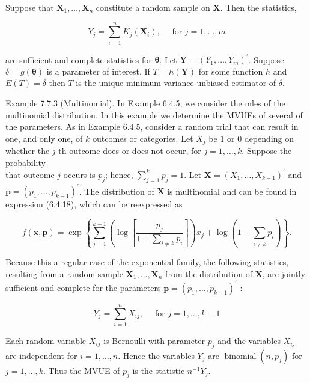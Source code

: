 Suppose that $\mathbf{X}_{1}, \ldots, \mathbf{X}_{n}$ constitute a random sample on $\mathbf{X}$. Then the statistics,


\begin{equation*}
Y_{j}=\sum_{i=1}^{n} K_{j}\left(\mathbf{X}_{i}\right), \quad \text { for } j=1, \ldots, m \tag{7.7.6}
\end{equation*}


are sufficient and complete statistics for $\boldsymbol{\theta}$. Let $\mathbf{Y}=\left(Y_{1}, \ldots, Y_{m}\right)^{\prime}$. Suppose $\delta=g(\boldsymbol{\theta})$ is a parameter of interest. If $T=h(\mathbf{Y})$ for some function $h$ and $E(T)=\delta$ then $T$ is the unique minimum variance unbiased estimator of $\delta$.

Example 7.7.3 (Multinomial). In Example 6.4.5, we consider the mles of the multinomial distribution. In this example we determine the MVUEs of several of the parameters. As in Example 6.4.5, consider a random trial that can result in one, and only one, of $k$ outcomes or categories. Let $X_{j}$ be 1 or 0 depending on whether the $j$ th outcome does or does not occur, for $j=1, \ldots, k$. Suppose the probability\\
that outcome $j$ occurs is $p_{j}$; hence, $\sum_{j=1}^{k} p_{j}=1$. Let $\mathbf{X}=\left(X_{1}, \ldots, X_{k-1}\right)^{\prime}$ and $\mathbf{p}=\left(p_{1}, \ldots, p_{k-1}\right)^{\prime}$. The distribution of $\mathbf{X}$ is multinomial and can be found in expression (6.4.18), which can be reexpressed as

$$
f(\mathbf{x}, \mathbf{p})=\exp \left\{\sum_{j=1}^{k-1}\left(\log \left[\frac{p_{j}}{1-\sum_{i \neq k} p_{i}}\right]\right) x_{j}+\log \left(1-\sum_{i \neq k} p_{i}\right)\right\} .
$$

Because this a regular case of the exponential family, the following statistics, resulting from a random sample $\mathbf{X}_{1}, \ldots, \mathbf{X}_{n}$ from the distribution of $\mathbf{X}$, are jointly sufficient and complete for the parameters $\mathbf{p}=\left(p_{1}, \ldots, p_{k-1}\right)^{\prime}$ :

$$
Y_{j}=\sum_{i=1}^{n} X_{i j}, \quad \text { for } j=1, \ldots, k-1
$$

Each random variable $X_{i j}$ is Bernoulli with parameter $p_{j}$ and the variables $X_{i j}$ are independent for $i=1, \ldots, n$. Hence the variables $Y_{j}$ are $\operatorname{binomial}\left(n, p_{j}\right)$ for $j=1, \ldots, k$. Thus the MVUE of $p_{j}$ is the statistic $n^{-1} Y_{j}$.


